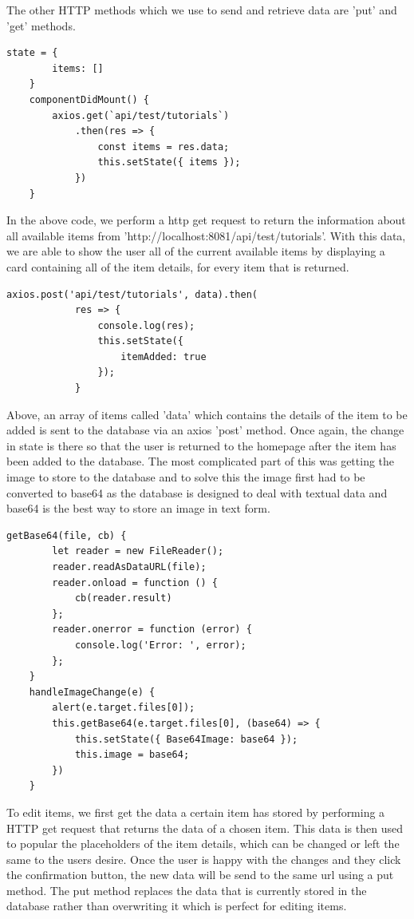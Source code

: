 The other HTTP methods which we use to send and retrieve data are 'put' and 'get' methods.
\begin{verbatim}
state = {
        items: []
    }
    componentDidMount() {
        axios.get(`api/test/tutorials`)
            .then(res => {
                const items = res.data;
                this.setState({ items });
            })
    }
\end{verbatim}
In the above code, we perform a http get request to return the information about all available items from 'http://localhost:8081/api/test/tutorials'. With this data, we are able to show the user all of the current available items by displaying a card containing all of the item details, for every item that is returned.
\begin{verbatim}
axios.post('api/test/tutorials', data).then(
            res => {
                console.log(res);
                this.setState({
                    itemAdded: true
                });
            }
\end{verbatim}
Above, an array of items called 'data' which contains the details of the item to be added is sent to the database via an axios 'post' method. Once again, the change in state is there so that the user is returned to the homepage after the item has been added to the database. The most complicated part of this was getting the image to store to the database and to solve this the image first had to be converted to base64 as the database is designed to deal with textual data and base64 is the best way to store an image in text form. 
\begin{verbatim}
getBase64(file, cb) {
        let reader = new FileReader();
        reader.readAsDataURL(file);
        reader.onload = function () {
            cb(reader.result)
        };
        reader.onerror = function (error) {
            console.log('Error: ', error);
        };
    }
    handleImageChange(e) {
        alert(e.target.files[0]);
        this.getBase64(e.target.files[0], (base64) => {
            this.setState({ Base64Image: base64 });
            this.image = base64;
        })
    }
\end{verbatim}
To edit items, we first get the data a certain item has stored by performing a HTTP get request that returns the data of a chosen item. This data is then used to popular the placeholders of the item details, which can be changed or left the same to the users desire. Once the user is happy with the changes and they click the confirmation button, the new data will be send to the same url using a put method. The put method replaces the data that is currently stored in the database rather than overwriting it which is perfect for editing items.
